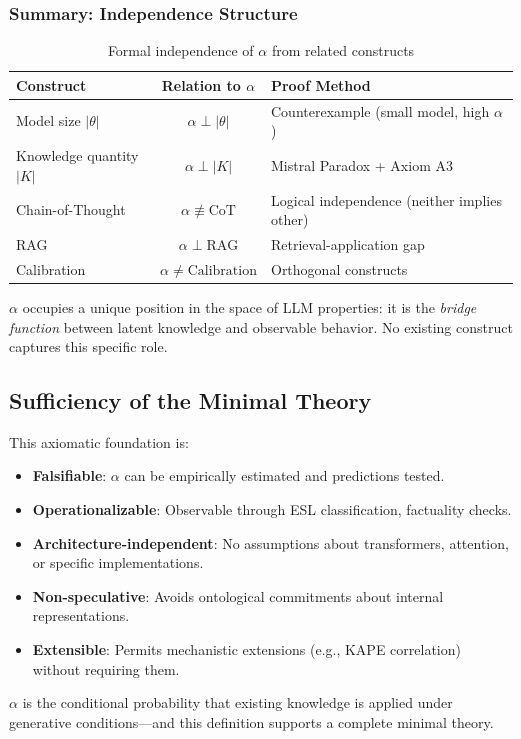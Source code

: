\documentclass[11pt,a4paper]{article}
\begin{document}
\subsubsection{Summary: Independence Structure}

\begin{table}[H]
\centering
\caption{Formal independence of $\alpha$ from related constructs}
\begin{tabular}{lcl}
\toprule
\textbf{Construct} & \textbf{Relation to $\alpha$} & \textbf{Proof Method} \\
\midrule
Model size $|\theta|$ & $\alpha \perp |\theta|$ & Counterexample (small model, high $\alpha$) \\
Knowledge quantity $|K|$ & $\alpha \perp |K|$ & Mistral Paradox + Axiom A3 \\
Chain-of-Thought & $\alpha \not\equiv \text{CoT}$ & Logical independence (neither implies other) \\
RAG & $\alpha \perp \text{RAG}$ & Retrieval-application gap \\
Calibration & $\alpha \neq \text{Calibration}$ & Orthogonal constructs \\
\bottomrule
\end{tabular}
\end{table}

\begin{principlebox}
$\alpha$ occupies a unique position in the space of LLM properties: it is the \emph{bridge function} between latent knowledge and observable behavior. No existing construct captures this specific role.
\end{principlebox}


\subsection{Sufficiency of the Minimal Theory}

This axiomatic foundation is:
\begin{itemize}
    \item \textbf{Falsifiable}: $\alpha$ can be empirically estimated and predictions tested.
    \item \textbf{Operationalizable}: Observable through ESL classification, factuality checks.
    \item \textbf{Architecture-independent}: No assumptions about transformers, attention, or specific implementations.
    \item \textbf{Non-speculative}: Avoids ontological commitments about internal representations.
    \item \textbf{Extensible}: Permits mechanistic extensions (e.g., KAPE correlation) without requiring them.
\end{itemize}

\begin{principlebox}[Summary]
$\alpha$ is the conditional probability that existing knowledge is applied under generative conditions---and this definition supports a complete minimal theory.
\end{principlebox}



\end{document}
